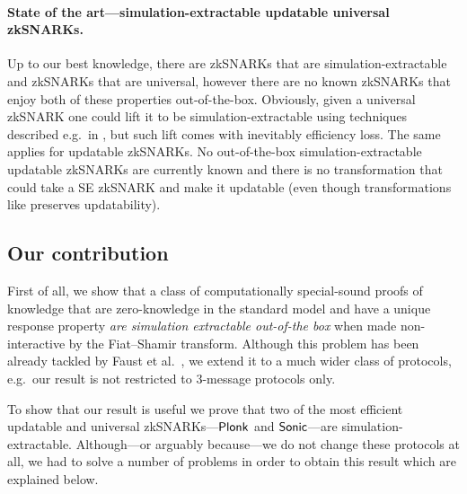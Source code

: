 \let\accentvec\vec \documentclass[runningheads]{llncs}
\begin{document}
\paragraph{State of the art---simulation-extractable updatable universal zkSNARKs.} 
Up to our best knowledge, there are zkSNARKs that are simulation-extractable
and zkSNARKs that are universal, however there are no known zkSNARKs that enjoy
both of these properties out-of-the-box. Obviously, given a universal zkSNARK
one could lift it to be simulation-extractable using techniques described
e.g.~in \cite{EPRINT:KZMQCP15,CCS:AbdRamSla20}, but such lift comes with
inevitably efficiency loss.  
The same applies for updatable zkSNARKs. No out-of-the-box
simulation-extractable updatable zkSNARKs are
currently known and there is no transformation that could take a SE zkSNARK
and make it updatable (even though transformations like \cite{CCS:AbdRamSla20}
preserves updatability).

\subsection{Our contribution}
First of all, we show that a class of computationally special-sound proofs of
knowledge that are zero-knowledge 
in the standard model and have a unique
response property \emph{are simulation extractable out-of-the box} when made
non-interactive by the Fiat--Shamir transform. Although this problem has been
already tackled by Faust et al.~\cite{INDOCRYPT:FKMV12}, we extend it to a
much wider class of protocols, e.g.~our result is not restricted to
$3$-message protocols only.

To show that our result is useful we prove that two of the most efficient updatable and universal
zkSNARKs---$\textnormal{\textsf{Plonk}}$ and ${\textnormal{\textsf{Sonic}}}$---are simulation-extractable.
Although---or arguably because---we do not change these protocols at all, we had to solve a number of
problems in order to obtain this result which are explained below. 
\end{document}
